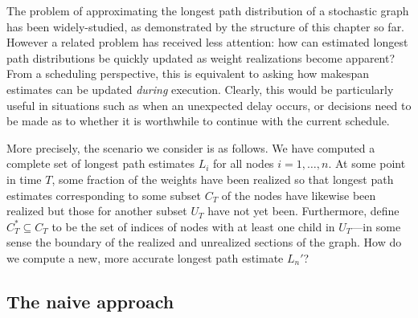 \documentclass[12pt]{article}
\begin{document}
The problem of approximating the longest path distribution of a stochastic graph has been widely-studied, as demonstrated by the structure of this chapter so far. However a related problem has received less attention: how can estimated longest path distributions be quickly updated as weight realizations become apparent? From a scheduling perspective, this is equivalent to asking how makespan estimates can be updated {\em during} execution. Clearly, this would be particularly useful in situations such as when an unexpected delay occurs, or decisions need to be made as to whether it is worthwhile to continue with the current schedule.

More precisely, the scenario we consider is as follows. We have computed a complete set of longest path estimates $L_i$ for all nodes $i = 1, \dots, n$. At some point in time $T$, some fraction of the weights have been realized so that longest path estimates corresponding to some subset $C_T$ of the nodes have likewise been realized but those for another subset $U_T$ have not yet been. Furthermore, define $C_T^* \subseteq C_T$ to be the set of indices of nodes with at least one child in $U_T$---in some sense the boundary of the realized and unrealized sections of the graph. How do we compute a new, more accurate longest path estimate $L_n'$?

\subsection{The naive approach}
\label{subsect.updating_naive}

\end{document}
